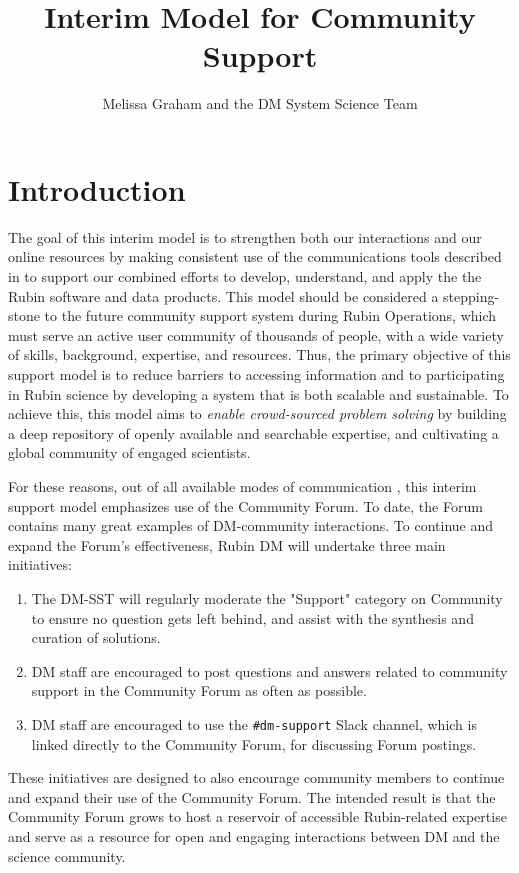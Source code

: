 \documentclass[DM,lsstdraft,authoryear,toc]{lsstdoc}
\title{Interim Model for Community Support}
\author{%
Melissa Graham and the DM System Science Team
}
\date{\vcsDate}
\begin{document}
\maketitle

\section{Introduction} \label{sec:intro}

The goal of this interim model is to strengthen both our interactions and our online resources by making consistent use of the communications tools described in  to support our combined efforts to develop, understand, and apply the the Rubin software and data products. 
This model should be considered a stepping-stone to the future community support system during Rubin Operations, which must serve an active user community of thousands of people, with a wide variety of skills, background, expertise, and resources.
Thus, the primary objective of this support model is to reduce barriers to accessing information and to participating in Rubin science by developing a system that is both scalable and sustainable.
To achieve this, this model aims to {\it enable crowd-sourced problem solving} by building a deep repository of openly available and searchable expertise, and cultivating a global community of engaged scientists.

For these reasons, out of all available modes of communication , this interim support model emphasizes use of the Community Forum. To date, the Forum contains many great examples of DM-community interactions. To continue and expand the Forum's effectiveness, Rubin DM will undertake three main initiatives: 
\begin{enumerate}
\item The DM-SST will regularly moderate the "Support" category on Community to ensure no question gets left behind, and assist with the synthesis and curation of solutions.
\item DM staff are encouraged to post questions and answers related to community support in the Community Forum as often as possible.
\item DM staff are encouraged to use the {\tt \#dm-support} Slack channel, which is linked directly to the Community Forum, for discussing Forum postings. 
\end{enumerate}
These initiatives are designed to also encourage community members to continue and expand their use of the Community Forum.
The intended result is that the Community Forum grows to host a reservoir of accessible Rubin-related expertise and serve as a resource for open and engaging interactions between DM and the science community. 
\end{document}
